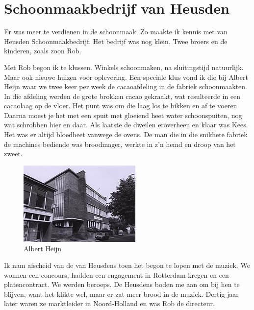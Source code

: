 \documentclass[10pt,twoside, openright]{memoir}
\begin{document}
\chapter{Schoonmaakbedrijf van Heusden} %
\label{cha:schoonmaakbedrijf}

Er was meer te verdienen in de schoonmaak. Zo maakte ik kennis met van Heusden Schoonmaakbedrijf. Het bedrijf was nog klein. Twee broers en de kinderen, zoals zoon Rob. 

Met Rob begon ik te klussen. Winkels schoonmaken, na sluitingstijd natuurlijk. Maar ook nieuwe huizen voor oplevering. Een speciale klus vond ik die bij Albert Heijn waar we twee keer per week de cacaoafdeling in de fabriek schoonmaakten. In die afdeling werden de grote brokken cacao gekraakt, wat resulteerde in een cacaolaag op de vloer. Het punt was om die laag los te bikken en af te voeren. Daarna moest je het met een spuit met gloeiend heet water schoonspuiten, nog wat schrobben hier en daar. Als laatste de dweilen eroverheen en klaar was Kees. Het was er altijd bloedheet vanwege de ovens. De man die in die snikhete fabriek de machines bediende was broodmager, werkte in z’n hemd en droop van het zweet.

\begin{figure}
\includegraphics[width=\textwidth]{img/ch34/image}
\caption*{\footnotesize Albert Heijn}
\end{figure}

Ik nam afscheid van de van Heusdens toen het begon te lopen met de muziek. We wonnen een concours, hadden een engagement in Rotterdam kregen en een platencontract. We werden beroeps. De Heusdens boden me aan om bij hen te blijven, want het klikte wel, maar er zat meer brood in de muziek. Dertig jaar later waren ze marktleider in Noord-Holland en was Rob de directeur.
\end{document}
